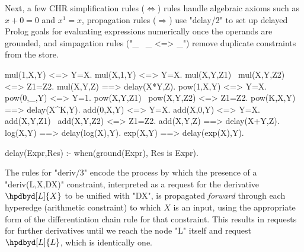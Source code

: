 Next, a few CHR simplification rules ($\Leftrightarrow$) rules handle algebraic axioms such as
$x + 0 = 0$ and $x^1 = x$, propagation rules ($\Rightarrow$) use "delay/2" to set up 
delayed Prolog goals for evaluating expressions numerically once the operands are
grounded, and simpagation rules ("_ \ _ <=> _") remove duplicate constraints from the store.
\begin{prolog-framed}[name=adone,firstnumber=5]
	mul(1,X,Y) <=> Y=X.
	mul(X,1,Y) <=> Y=X.
	mul(X,Y,Z1)  \ mul(X,Y,Z2) <=> Z1=Z2.
	mul(X,Y,Z)   ==> delay(X*Y,Z).
	pow(1,X,Y)  <=> Y=X.
	pow(0,_,Y)  <=> Y=1.
	pow(X,Y,Z1) \ pow(X,Y,Z2) <=> Z1=Z2.
	pow(K,X,Y)   ==> delay(X^K,Y).
	add(0,X,Y) <=> Y=X.
	add(X,0,Y) <=> Y=X.
	add(X,Y,Z1)  \ add(X,Y,Z2) <=> Z1=Z2.
	add(X,Y,Z)   ==> delay(X+Y,Z).
	log(X,Y)     ==> delay(log(X),Y).
	exp(X,Y)     ==> delay(exp(X),Y).

	delay(Expr,Res) :- when(ground(Expr), Res is Expr).
\end{prolog-framed}
The rules for "deriv/3" encode the process by which the presence of a
"deriv(L,X,DX)" constraint, interpreted as a request
for the derivative $\hpdbyd[L]{X}$ to be unified with "DX",
is propagated \emph{forward} through each hyperedge (arithmetic
constraint) to which $X$ is an input, using the appropriate form
of the differentiation chain rule for that constraint. This results
in requests for further derivatives until we reach the node "L" itself
and request $\hpdbyd[L]{L}$, which is identically one.

